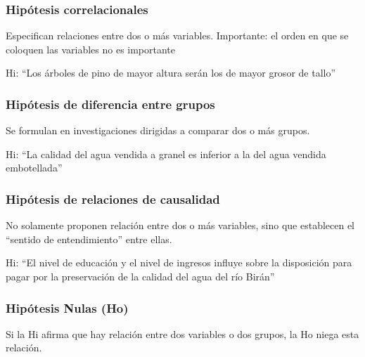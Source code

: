 \documentclass{beamer}
\begin{document}
					\begin{frame}
						\frametitle{Hipótesis correlacionales}
						\begin{definition}
							Especifican relaciones entre dos o más variables.
							Importante: el orden en que se coloquen las variables no es importante
							
						\end{definition}
						\begin{example}
							Hi: “Los árboles de pino de mayor altura serán los de mayor grosor de tallo”
							
						\end{example}
					\end{frame}
						\begin{frame}
							\frametitle{Hipótesis de diferencia entre grupos}
							\begin{definition}
								Se formulan en investigaciones dirigidas a comparar dos o más grupos.
								
							\end{definition}
							\begin{example}
								Hi: “La calidad del agua vendida a granel es inferior a la del agua vendida embotellada”
								
							\end{example}
						\end{frame}
				  	    \begin{frame}
								\frametitle{Hipótesis de relaciones de causalidad}
								\begin{definition}
									No solamente proponen relación entre dos o más variables, sino que establecen el “sentido de entendimiento” entre ellas.
									
								\end{definition}
								\begin{example}
									Hi: “El nivel de educación y el nivel de ingresos influye sobre la disposición para pagar por la preservación de la calidad del agua del río Birán”
									
								\end{example}
							\end{frame}
							\begin{frame}
								\frametitle{Hipótesis Nulas (Ho)}
								\begin{definition}
									Si la Hi afirma que hay relación entre dos variables o dos grupos, la Ho niega esta relación.
									
								\end{definition}
								
							\end{frame}
\end{document}
